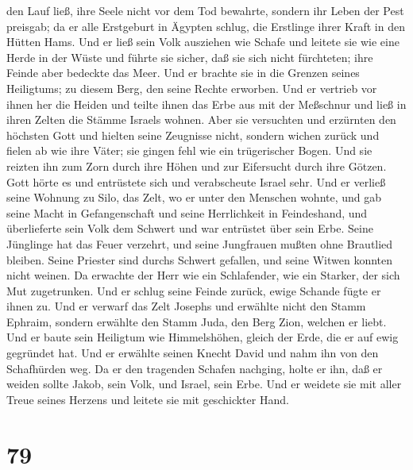 den Lauf ließ, ihre Seele nicht vor dem Tod bewahrte, sondern ihr Leben
der Pest preisgab;  da er alle Erstgeburt in Ägypten
schlug, die Erstlinge ihrer Kraft in den Hütten Hams. 
Und er ließ sein Volk ausziehen wie Schafe und leitete sie wie eine
Herde in der Wüste  und führte sie sicher, daß sie sich
nicht fürchteten; ihre Feinde aber bedeckte das Meer. 
Und er brachte sie in die Grenzen seines Heiligtums; zu diesem Berg, den
seine Rechte erworben.  Und er vertrieb vor ihnen her die
Heiden und teilte ihnen das Erbe aus mit der Meßschnur und ließ in ihren
Zelten die Stämme Israels wohnen.  Aber sie versuchten
und erzürnten den höchsten Gott und hielten seine Zeugnisse nicht,
 sondern wichen zurück und fielen ab wie ihre Väter; sie
gingen fehl wie ein trügerischer Bogen.  Und sie reizten
ihn zum Zorn durch ihre Höhen und zur Eifersucht durch ihre Götzen.
 Gott hörte es und entrüstete sich und verabscheute
Israel sehr.  Und er verließ seine Wohnung zu Silo, das
Zelt, wo er unter den Menschen wohnte,  und gab seine
Macht in Gefangenschaft und seine Herrlichkeit in Feindeshand,
 und überlieferte sein Volk dem Schwert und war entrüstet
über sein Erbe.  Seine Jünglinge hat das Feuer verzehrt,
und seine Jungfrauen mußten ohne Brautlied bleiben. 
Seine Priester sind durchs Schwert gefallen, und seine Witwen konnten
nicht weinen.  Da erwachte der Herr wie ein Schlafender,
wie ein Starker, der sich Mut zugetrunken.  Und er schlug
seine Feinde zurück, ewige Schande fügte er ihnen zu. 
Und er verwarf das Zelt Josephs und erwählte nicht den Stamm Ephraim,
 sondern erwählte den Stamm Juda, den Berg Zion, welchen
er liebt.  Und er baute sein Heiligtum wie Himmelshöhen,
gleich der Erde, die er auf ewig gegründet hat.  Und er
erwählte seinen Knecht David und nahm ihn von den Schafhürden weg.
 Da er den tragenden Schafen nachging, holte er ihn, daß
er weiden sollte Jakob, sein Volk, und Israel, sein Erbe.
 Und er weidete sie mit aller Treue seines Herzens und
leitete sie mit geschickter Hand.

\hypertarget{section-78}{%
\section{79}\label{section-78}}

